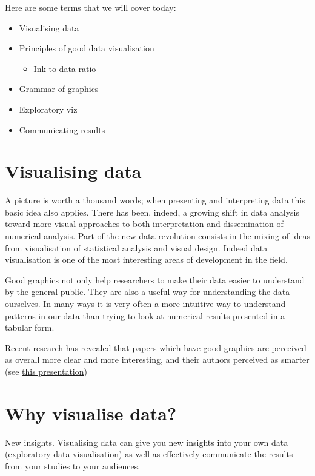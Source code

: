 \documentclass[]{book}
\providecommand{\tightlist}{%
  \setlength{\itemsep}{0pt}\setlength{\parskip}{0pt}}
\theoremstyle{definition}
\theoremstyle{definition}
\theoremstyle{definition}
\theoremstyle{remark}
\begin{document}
Here are some terms that we will cover today:

\begin{itemize}
\tightlist
\item
  Visualising data
\item
  Principles of good data visualisation

  \begin{itemize}
  \tightlist
  \item
    Ink to data ratio
  \end{itemize}
\item
  Grammar of graphics
\item
  Exploratory viz
\item
  Communicating results
\end{itemize}

\hypertarget{visualising-data}{%
\section{Visualising data}\label{visualising-data}}

A picture is worth a thousand words; when presenting and interpreting
data this basic idea also applies. There has been, indeed, a growing
shift in data analysis toward more visual approaches to both
interpretation and dissemination of numerical analysis. Part of the new
data revolution consists in the mixing of ideas from visualisation of
statistical analysis and visual design. Indeed data visualisation is one
of the most interesting areas of development in the field.

Good graphics not only help researchers to make their data easier to
understand by the general public. They are also a useful way for
understanding the data ourselves. In many ways it is very often a more
intuitive way to understand patterns in our data than trying to look at
numerical results presented in a tabular form.

Recent research has revealed that papers which have good graphics are
perceived as overall more clear and more interesting, and their authors
perceived as smarter (see \href{https://vimeo.com/181771433}{this
presentation})

\hypertarget{why-visualise-data}{%
\section{Why visualise data?}\label{why-visualise-data}}

New insights. Visualising data can give you new insights into your own
data (exploratory data visualisation) as well as effectively communicate
the results from your studies to your audiences.
\end{document}
